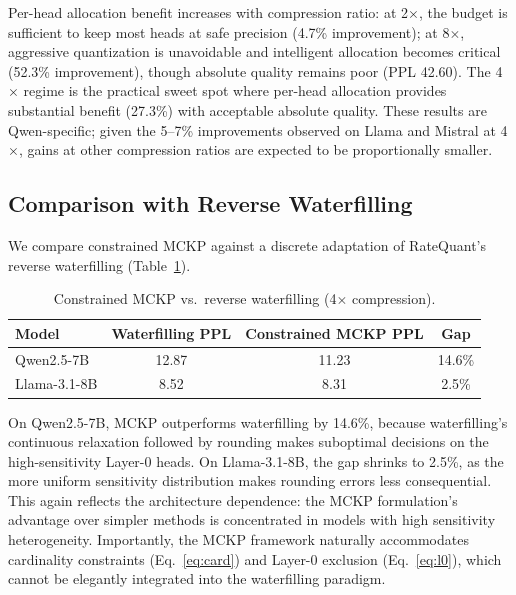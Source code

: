 \documentclass[11pt]{article}
\begin{document}
Per-head allocation benefit increases with compression ratio: at 2$\times$, the budget is sufficient to keep most heads at safe precision (4.7\% improvement); at 8$\times$, aggressive quantization is unavoidable and intelligent allocation becomes critical (52.3\% improvement), though absolute quality remains poor (PPL 42.60).
The 4$\times$ regime is the practical sweet spot where per-head allocation provides substantial benefit (27.3\%) with acceptable absolute quality.
These results are Qwen-specific; given the 5--7\% improvements observed on Llama and Mistral at 4$\times$, gains at other compression ratios are expected to be proportionally smaller.

\subsection{Comparison with Reverse Waterfilling}
\label{sec:waterfilling}

We compare constrained MCKP against a discrete adaptation of RateQuant's reverse waterfilling (Table~\ref{tab:waterfilling}).

\begin{table}[h]
\centering
\caption{Constrained MCKP vs.\ reverse waterfilling (4$\times$ compression).}
\label{tab:waterfilling}
\begin{tabular}{lccc}
\toprule
\textbf{Model} & \textbf{Waterfilling PPL} & \textbf{Constrained MCKP PPL} & \textbf{Gap} \\
\midrule
Qwen2.5-7B    & 12.87 & 11.23 & 14.6\% \\
Llama-3.1-8B  & 8.52  & 8.31  & 2.5\% \\
\bottomrule
\end{tabular}
\end{table}

On Qwen2.5-7B, MCKP outperforms waterfilling by 14.6\%, because waterfilling's continuous relaxation followed by rounding makes suboptimal decisions on the high-sensitivity Layer-0 heads.
On Llama-3.1-8B, the gap shrinks to 2.5\%, as the more uniform sensitivity distribution makes rounding errors less consequential.
This again reflects the architecture dependence: the MCKP formulation's advantage over simpler methods is concentrated in models with high sensitivity heterogeneity.
Importantly, the MCKP framework naturally accommodates cardinality constraints (Eq.~\ref{eq:card}) and Layer-0 exclusion (Eq.~\ref{eq:l0}), which cannot be elegantly integrated into the waterfilling paradigm.
\end{document}
